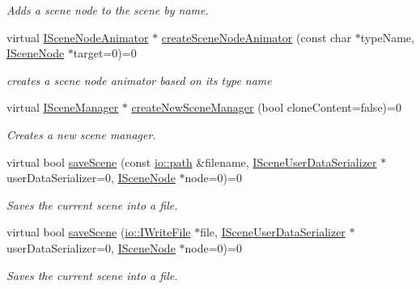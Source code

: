 \begin{DoxyCompactItemize}
\begin{DoxyCompactList}\small\item\em Adds a scene node to the scene by name. \end{DoxyCompactList}\item 
virtual \hyperlink{classirr_1_1scene_1_1ISceneNodeAnimator}{I\+Scene\+Node\+Animator} $\ast$ \hyperlink{classirr_1_1scene_1_1ISceneManager_ac63c38a05b8e7d0a11ddb1752da36835}{create\+Scene\+Node\+Animator} (const char $\ast$type\+Name, \hyperlink{classirr_1_1scene_1_1ISceneNode}{I\+Scene\+Node} $\ast$target=0)=0
\begin{DoxyCompactList}\small\item\em creates a scene node animator based on its type name \end{DoxyCompactList}\item 
virtual \hyperlink{classirr_1_1scene_1_1ISceneManager}{I\+Scene\+Manager} $\ast$ \hyperlink{classirr_1_1scene_1_1ISceneManager_a94805dd4eca41ccef9607aefe669aed9}{create\+New\+Scene\+Manager} (bool clone\+Content=false)=0
\begin{DoxyCompactList}\small\item\em Creates a new scene manager. \end{DoxyCompactList}\item 
virtual bool \hyperlink{classirr_1_1scene_1_1ISceneManager_a6dd059e96ff4f7233b7ba1ed7e39c337}{save\+Scene} (const \hyperlink{namespaceirr_1_1io_ab1bdc45edb3f94d8319c02bc0f840ee1}{io\+::path} \&filename, \hyperlink{classirr_1_1scene_1_1ISceneUserDataSerializer}{I\+Scene\+User\+Data\+Serializer} $\ast$user\+Data\+Serializer=0, \hyperlink{classirr_1_1scene_1_1ISceneNode}{I\+Scene\+Node} $\ast$node=0)=0
\begin{DoxyCompactList}\small\item\em Saves the current scene into a file. \end{DoxyCompactList}\item 
virtual bool \hyperlink{classirr_1_1scene_1_1ISceneManager_a5de4b5131186f3bcd8b0213f68e4a9ce}{save\+Scene} (\hyperlink{classirr_1_1io_1_1IWriteFile}{io\+::\+I\+Write\+File} $\ast$file, \hyperlink{classirr_1_1scene_1_1ISceneUserDataSerializer}{I\+Scene\+User\+Data\+Serializer} $\ast$user\+Data\+Serializer=0, \hyperlink{classirr_1_1scene_1_1ISceneNode}{I\+Scene\+Node} $\ast$node=0)=0
\begin{DoxyCompactList}\small\item\em Saves the current scene into a file. \end{DoxyCompactList}\item 

\end{DoxyCompactItemize}
